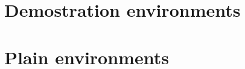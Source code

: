 \documentclass[
  toc,
  todo,
  charter,
]{apuntes}
\begin{document}
\begin{prop}[][reff]
	\lipsum[1]
\end{prop}

\begin{teorema}[][reff]
	\lipsum[1]
\end{teorema}

\begin{corolario}[][reff]
	\lipsum[1]
\end{corolario}

\begin{lema}[][reff]
	\lipsum[1]
\end{lema}

\section{Demostration environments}

\begin{dem}[]
	\lipsum[1]
\end{dem}

\begin{sol}[]
	\lipsum[1]
\end{sol}

\section{Plain environments}

\begin{aff}[]
	\lipsum[1]
\end{aff}

\begin{ejemplo}[][reff]
	\lipsum[1]
\end{ejemplo}

\begin{ejercicio}[][reff]
	\lipsum[1]
\end{ejercicio}

\begin{pregunta}[][reff]
	\lipsum[1]
\end{pregunta}

\begin{obs}[][reff]
	\lipsum[1]
\end{obs}

\begin{notacion}[]
	\lipsum[1]
\end{notacion}

\begin{recuerdo}[]
	\lipsum[1]
\end{recuerdo}

\begin{nota}[]
	\lipsum[1]
\end{nota}
\end{document}
